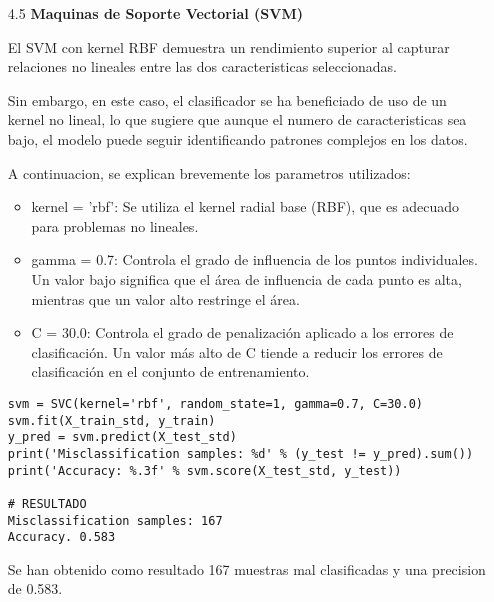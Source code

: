 \documentclass{article}
\begin{document}
\bigskip

\begin{itemize}

\item[4.5]  {\bf Maquinas de Soporte Vectorial (SVM)}

El SVM con kernel RBF demuestra un rendimiento superior al capturar relaciones no lineales entre las dos caracteristicas seleccionadas.

Sin embargo, en este caso, el clasificador se ha beneficiado de uso de un kernel no lineal, lo que sugiere que aunque el numero de caracteristicas sea bajo, el modelo puede seguir identificando patrones complejos en los datos.

A continuacion, se explican brevemente los parametros utilizados:

\begin{itemize}

\item
kernel = 'rbf': Se utiliza el kernel radial base (RBF), que es adecuado para problemas no lineales.

\item
gamma = 0.7: Controla el grado de influencia de los puntos individuales. Un valor bajo significa que el área de influencia de cada punto es alta, mientras que un valor alto restringe el área.

\item
C = 30.0: Controla el grado de penalización aplicado a los errores de clasificación. Un valor más alto de C tiende a reducir los errores de clasificación en el conjunto de entrenamiento.

\end{itemize}

\begin{tcolorbox}[width=14cm]
\begin{scriptsize}
\begin{verbatim}
svm = SVC(kernel='rbf', random_state=1, gamma=0.7, C=30.0)
svm.fit(X_train_std, y_train)
y_pred = svm.predict(X_test_std)
print('Misclassification samples: %d' % (y_test != y_pred).sum())
print('Accuracy: %.3f' % svm.score(X_test_std, y_test))

# RESULTADO
Misclassification samples: 167
Accuracy. 0.583
\end{verbatim}
\end{scriptsize}
\end{tcolorbox}

Se han obtenido como resultado 167 muestras mal clasificadas y una precision de 0.583.

\end{itemize}
\end{document}
